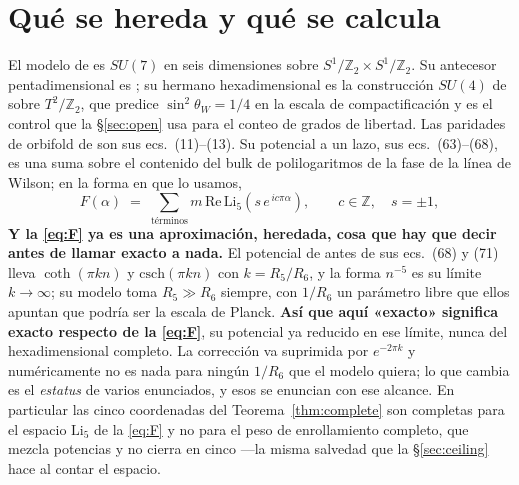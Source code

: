 \documentclass[11pt,a4paper]{article}
\newcommand{\ZZ}{\mathbb{Z}}
\newcommand{\su}[1]{SU(#1)}
\begin{document}
\section{Qué se hereda y qué se calcula}\label{sec:setting}

El modelo de \cite{KM25} es $\su7$ en seis dimensiones sobre $S^1/\ZZ_2\times S^1/\ZZ_2$. Su
antecesor pentadimensional es \cite{KTY17}; su hermano hexadimensional es la construcción
$\su4$ de \cite{AHMN} sobre $T^2/\ZZ_2$, que predice $\sin^2\theta_W = 1/4$ en la escala de
compactificación y es el control que la \S\ref{sec:open} usa para el conteo de grados de
libertad. Las paridades de orbifold de \cite{KM25} son
sus ecs.~(11)--(13). Su potencial a un lazo, sus ecs.~(63)--(68), es una suma sobre el contenido del
bulk de polilogaritmos de la fase de la línea de Wilson; en la forma en que lo usamos,
\begin{equation}\label{eq:F}
  F(\alpha)\;=\;\sum_{\text{términos}} m\,\mathrm{Re}\,\mathrm{Li}_5\!\left(s\,e^{\,i c \pi \alpha}\right),
  \qquad c\in\ZZ,\quad s=\pm1,
\end{equation}
\noindent \textbf{Y la \eqref{eq:F} ya es una aproximación, heredada, cosa que hay que decir antes
de llamar exacto a nada.} El potencial de \cite{KM25} antes de sus ecs.~(68) y (71) lleva
$\coth(\pi k n)$ y $\mathrm{csch}(\pi k n)$ con $k=R_5/R_6$, y la forma $n^{-5}$ es su límite
$k\to\infty$; su modelo toma $R_5\gg R_6$ siempre, con $1/R_6$ un parámetro libre que ellos apuntan
que podría ser la escala de Planck.
\textbf{Así que aquí «exacto» significa exacto respecto de la \eqref{eq:F}}, su potencial ya
reducido en ese límite, nunca del hexadimensional completo. La corrección va suprimida por
$e^{-2\pi k}$ y numéricamente no es nada para ningún $1/R_6$ que el modelo quiera; lo que cambia es
el \emph{estatus} de varios enunciados, y esos se enuncian con ese alcance.
En particular las cinco coordenadas del Teorema~\ref{thm:complete} son completas para el espacio
$\mathrm{Li}_5$ de la \eqref{eq:F} y no para el peso de enrollamiento completo, que mezcla potencias y no
cierra en cinco ---la misma salvedad que la \S\ref{sec:ceiling} hace al contar el espacio.
\end{document}
